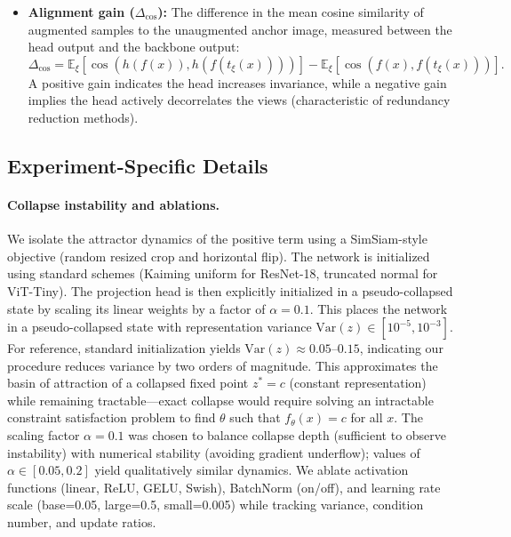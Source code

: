 \documentclass{article}
\theoremstyle{plain}
\theoremstyle{definition}
\theoremstyle{remark}
\begin{document}
\begin{itemize}[leftmargin=*]
    \begin{equation*}
        \text{Rank}(z) = \exp\left( - \sum_k p_k \log p_k \right), \quad \text{where } p_k = \frac{\sigma_k^2}{\sum_i \sigma_i^2}.
    \end{equation*}
    \item \textbf{Alignment gain ($\Delta_{\text{cos}}$):} The difference in the mean cosine similarity of augmented samples to the unaugmented anchor image, measured between the head output and the backbone output:
    \begin{equation*}
        \Delta_{\text{cos}} = \mathbb{E}_{\xi} [\cos(h(f(x)), h(f(t_\xi(x))))] - \mathbb{E}_{\xi} [\cos(f(x), f(t_\xi(x)))].
    \end{equation*}
    A positive gain indicates the head increases invariance, while a negative gain implies the head actively decorrelates the views (characteristic of redundancy reduction methods).
\end{itemize}

\subsection{Experiment-Specific Details}

\paragraph{Collapse instability and ablations.} We isolate the attractor dynamics of the positive term using a SimSiam-style objective (random resized crop and horizontal flip). The network is initialized using standard schemes (Kaiming uniform for ResNet-18, truncated normal for ViT-Tiny). The projection head is then explicitly initialized in a pseudo-collapsed state by scaling its linear weights by a factor of $\alpha = 0.1$. This places the network in a pseudo-collapsed state with representation variance $\text{Var}(z) \in [10^{-5}, 10^{-3}]$. For reference, standard initialization yields $\text{Var}(z) \approx 0.05$--$0.15$, indicating our procedure reduces variance by two orders of magnitude. This approximates the basin of attraction of a collapsed fixed point $z^* = c$ (constant representation) while remaining tractable---exact collapse would require solving an intractable constraint satisfaction problem to find $\theta$ such that $f_\theta(x) = c$ for all $x$. The scaling factor $\alpha = 0.1$ was chosen to balance collapse depth (sufficient to observe instability) with numerical stability (avoiding gradient underflow); values of $\alpha \in [0.05, 0.2]$ yield qualitatively similar dynamics. We ablate activation functions (linear, ReLU, GELU, Swish), BatchNorm (on/off), and learning rate scale (base=0.05, large=0.5, small=0.005) while tracking variance, condition number, and update ratios.
\end{document}
